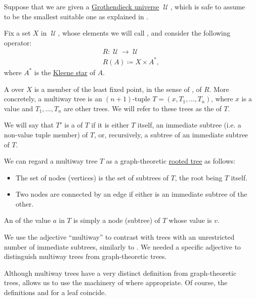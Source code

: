 \begin{definition}\label{def:multiway_tree}\mimprovised
  Suppose that we are given a \hyperref[def:grothendieck_universe]{Grothendieck universe} \( \mscrU \), which is safe to assume to be the smallest suitable one as explained in .

  Fix a set \( X \) in \( \mscrU \), whose elements we will call , and consider the following operator:
  \begin{equation*}
    \begin{aligned}
      &R: \mscrU \to \mscrU \\
      &R(A) \coloneqq X \times A^*,
    \end{aligned}
  \end{equation*}
  where \( A^* \) is the \hyperref[def:formal_language/kleene_star]{Kleene star} of \( A \).

  A  over \( X \) is a member of the least fixed point, in the sense of , of \( R \). More concretely, a multiway tree is an \( (n + 1) \)-tuple \( T = (x, T_1, \ldots, T_n) \), where \( x \) is a value and \( T_1, \ldots, T_n \) are other trees. We will refer to these trees as the  of \( T \).

  \begin{thmenum}
     We will say that \( T' \) is a  of \( T \) if it is either \( T \) itself, an immediate subtree (i.e. a non-value tuple member) of \( T \), or, recursively, a subtree of an immediate subtree of \( T \).

     We can regard a multiway tree \( T \) as a graph-theoretic \hyperref[def:rooted_tree]{rooted tree} as follows:
    \begin{itemize}
      \item The set of nodes (vertices) is the set of subtrees of \( T \), the root being \( T \) itself.
      \item Two nodes are connected by an edge if either is an immediate subtree of the other.
    \end{itemize}

     An  of the value \( a \) in \( T \) is simply a node (subtree) of \( T \) whose value is \( v \).
  \end{thmenum}
\end{definition}
\begin{comments}
  \item We use the adjective \enquote{multiway} to contrast with trees with an unrestricted number of immediate subtrees, similarly to . We needed a specific adjective to distinguish multiway trees from graph-theoretic trees.

  \item Although multiway trees have a very distinct definition from graph-theoretic trees,  allows us to use the machinery of  where appropriate. Of course, the definitions  and  for a leaf coincide.
\end{comments}
